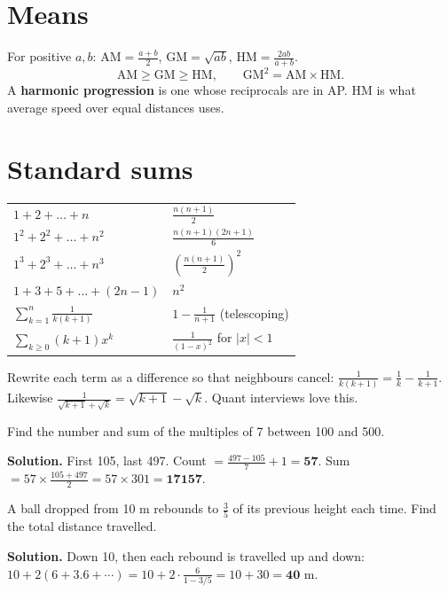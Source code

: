 \documentclass[11pt,a4paper,openany]{report}
\begin{document}
\section{Means}
For positive $a,b$: $\text{AM}=\frac{a+b}2$, $\text{GM}=\sqrt{ab}$, $\text{HM}=\frac{2ab}{a+b}$.
\[\text{AM}\ge\text{GM}\ge\text{HM},\qquad\text{GM}^2=\text{AM}\times\text{HM}.\]
A \textbf{harmonic progression} is one whose reciprocals are in AP. HM is what average speed over equal distances uses.

\section{Standard sums}
\begin{center}
\begin{tabular}{ll}
\toprule
$1+2+\dots+n$ & $\frac{n(n+1)}2$\\
$1^2+2^2+\dots+n^2$ & $\frac{n(n+1)(2n+1)}6$\\
$1^3+2^3+\dots+n^3$ & $\left(\frac{n(n+1)}2\right)^2$\\
$1+3+5+\dots+(2n-1)$ & $n^2$\\
$\sum_{k=1}^n\frac1{k(k+1)}$ & $1-\frac1{n+1}$ (telescoping)\\
$\sum_{k\ge0}(k+1)x^k$ & $\frac1{(1-x)^2}$ for $|x|<1$\\
\bottomrule
\end{tabular}
\end{center}

\begin{idea}[Telescoping]
Rewrite each term as a difference so that neighbours cancel: $\frac1{k(k+1)}=\frac1k-\frac1{k+1}$. Likewise $\frac1{\sqrt{k+1}+\sqrt k}=\sqrt{k+1}-\sqrt k$. Quant interviews love this.
\end{idea}

\begin{example}[multiples]
Find the number and sum of the multiples of 7 between 100 and 500.

\textbf{Solution.} First 105, last 497. Count $=\frac{497-105}7+1=\mathbf{57}$. Sum $=57\times\frac{105+497}2=57\times301=\mathbf{17157}$.
\end{example}

\begin{example}
A ball dropped from 10 m rebounds to $\frac35$ of its previous height each time. Find the total distance travelled.

\textbf{Solution.} Down 10, then each rebound is travelled up and down: $10+2\left(6+3.6+\cdots\right)=10+2\cdot\frac6{1-3/5}=10+30=\mathbf{40}$ m.
\end{example}
\end{document}
